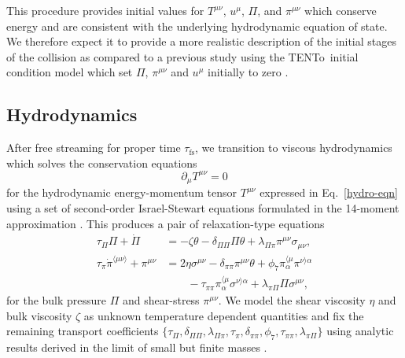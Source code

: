 \documentclass[aps,prc,reprint,amsmath,nofootinbib]{revtex4-1}
\newcommand{\trento}{T\raisebox{-0.5ex}{R}ENTo}
\newcommand{\taufs}{\tau_\text{fs}}
\begin{document}
This procedure provides initial values for $T^{\mu\nu}$, $u^\mu$, $\Pi$, and $\pi^{\mu\nu}$ which conserve energy and are consistent with the underlying hydrodynamic equation of state.
We therefore expect it to provide a more realistic description of the initial stages of the collision as compared to a previous study using the \trento\ initial condition model which set $\Pi$, $\pi^{\mu\nu}$ and $u^\mu$ initially to zero \cite{Bernhard:2016tnd}.

\subsection{Hydrodynamics}

After free streaming for proper time $\taufs$, we transition to viscous hydrodynamics which solves the conservation equations
\begin{equation}
  \label{eq:continuity}
  \partial_\mu T^{\mu\nu} = 0
\end{equation}
for the hydrodynamic energy-momentum tensor $T^{\mu\nu}$ expressed in Eq.~\eqref{hydro-eqn} using a set of second-order Israel-Stewart equations formulated in the 14-moment approximation
\cite{Israel:1979wp, Israel:1976aa, Denicol:2012cn, Denicol:2010xn}.
This produces a pair of relaxation-type equations
\begin{subequations}
  \label{eq:relaxation}
  \begin{align}
    \tau_\Pi \Pi + \dot{\Pi} &=
      - \zeta \theta - \delta_{\Pi\Pi} \Pi\theta
      + \lambda_{\Pi\pi} \pi^{\mu\nu} \sigma_{\mu\nu}, \\[1ex]
    \tau_\pi \dot{\pi}^{\langle \mu\nu \rangle} + \pi^{\mu\nu} &=
      2\eta\sigma^{\mu\nu} - \delta_{\pi\pi} \pi^{\mu\nu} \theta
      + \phi_7 \pi_\alpha^{\langle \mu} \pi^{\nu \rangle \alpha} \nonumber \\
      &\qquad {} - \tau_{\pi\pi} \pi_\alpha^{\langle \mu}\sigma^{\nu \rangle \alpha}
      + \lambda_{\pi\Pi} \Pi \sigma^{\mu\nu},
  \end{align}
\end{subequations}
for the bulk pressure $\Pi$ and shear-stress $\pi^{\mu\nu}$.
We model the shear viscosity $\eta$ and bulk viscosity $\zeta$ as unknown temperature dependent quantities and fix the remaining transport coefficients $\{\tau_\Pi, \delta_{\Pi\Pi}, \lambda_{\Pi\pi}, \tau_\pi, \delta_{\pi\pi}, \phi_7, \tau_{\pi\pi}, \lambda_{\pi\Pi}\}$ using analytic results derived in the limit of small but finite masses \cite{Denicol:2014vaa}.
\end{document}
